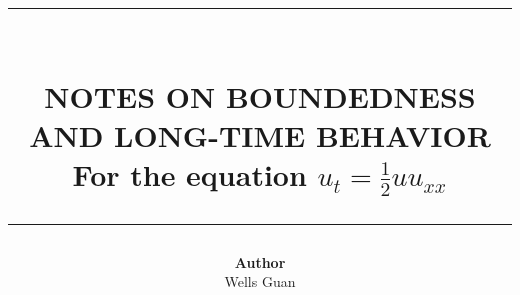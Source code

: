 \documentclass{article}
\newcommand{\HRule}[1]{\rule{\linewidth}{#1}}
\begin{document}
\title{\normalsize \textsc{}\\[2.0cm]
\HRule{1.5pt} \\
\LARGE \textbf{\uppercase{Notes on Boundedness and Long-Time Behavior}}\\[0.4cm]
\Large For the equation $u_t=\frac12 u u_{xx}$\\
\HRule{2.0pt}}
\author{\textbf{Author}\\Wells Guan\\}
\date{}

\maketitle
\tableofcontents
\newpage



\end{document}
